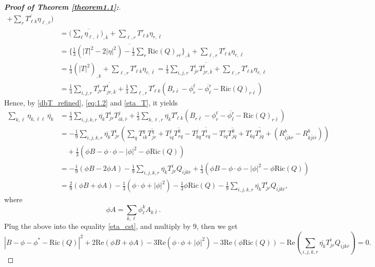 \documentclass{amsart}
\numberwithin{equation}{section}
\theoremstyle{definition}
\renewcommand{\1}{\mathds{1}}
\renewcommand{\>}{\rightarrow}
\begin{document}
\begin{proof}[{\bf Proof of Theorem \ref{theorem1.1}:}]
\[\begin{aligned}
{+  \sum_r \overline{T^r_{\ell k}}\eta_{\ell,\bar{r}}} \big)  \\
&= \overline{ \big(\sum_\ell \eta_{\ell,\bar{\ell}}\big)_{\!,\bar{k}}} +  \sum_{\ell,r} T^r_{\ell k}\eta_{r,\bar{\ell}} \\
&= \overline{\big\{ \frac{1}{3}(|T|^2-2|\eta|^2)-\frac{1}{3} \sum_r \mathrm{Ric}(Q)_{r \bar{r}}\big\}_{\!,\bar{k}}}
+  \sum_{\ell,r} T^r_{\ell k}\eta_{r,\bar{\ell}} \\
&=  \frac{1}{3}(|T|^2)_{\!,k}
+  \sum_{\ell,r} T^r_{\ell k}\eta_{r,\bar{\ell}}  =    \frac{1}{3} \sum_{i,j ,r} T^i_{j r} \overline{  T^i_{j r,\bar{k} }  } +   \sum_{\ell,r} T^r_{\ell k}\eta_{r,\bar{\ell}}  \\
&= \frac{1}{3} \sum_{i,j,r}T^i_{jr} \overline{T^i_{jr,\bar{k}}} + \frac{1}{3} \sum_{\ell ,r}T^r_{\ell k} \left( B_{r \bar{\ell}} - \phi_r^{\ell} - \overline{\phi_{\ell}^r}  - \mathrm{Ric}(Q)_{r \bar{\ell}} \right)
\end{aligned}\]
Hence, by \eqref{dbT_refined}, \eqref{eq:1.2} and \eqref{eta_T}, it yields
\[ \begin{aligned}
\sum_{k,\ell}\eta_{k,\bar{\ell}\ell} \,\overline{\eta_k} &=
\frac{1}{3} \sum_{i,j,k,r} \overline{\eta_k} T^i_{jr} T^j_{ik,\bar{r}} + \frac{1}{3} \sum_{k,\ell ,r} \overline{\eta_k} T^r_{\ell k} \left(  B_{r \bar{\ell}} - \phi_r^{\ell} - \overline{\phi_{\ell}^r} -  \mathrm{Ric}(Q)_{r \bar{\ell}} \right) \\
&= -\frac{1}{9} \sum_{i,j,k,r} \overline{\eta_k} T^i_{jr} \left(\sum_q T^q_{ik}\overline{T^q_{j r}} + T^j_{iq} \overline{T^k_{r q}}
- T^j_{kq}\overline{T^i_{r q}} - T^r_{iq} \overline{T^k_{jq}} + T^r_{kq}\overline{T^i_{jq}}
+ ( R^b_{i\bar{j}k\bar{r}} - R^b_{k \bar{j} i \bar{r}} )\right) \\
&\quad + \frac{1}{3}(\phi B - \phi \cdot \phi - |\phi|^2 - \phi \mathrm{Ric}(Q)) \\
&= -\frac{1}{9}(\phi B - 2\phi A)  - \frac{1}{9} \sum_{i,j,k,r} \overline{\eta_k} T^i_{jr} Q_{i\bar{j}k\bar{r}} + \frac{1}{3}( \phi B - \phi \cdot \phi - |\phi|^2  - \phi \mathrm{Ric}(Q))
 \\
&= \frac{2}{9}(\phi B + \phi A)- \frac{1}{3}(\phi \cdot \phi + |\phi|^2) - \frac{1}{3} \phi \mathrm{Ric}(Q)
- \frac{1}{9} \sum_{i,j,k,r} \overline{\eta_k} T^i_{jr} Q_{i\bar{j}k\bar{r}} ,
\end{aligned}\]
where
\[\phi A = \sum_{k,\ell}\phi^k_{\ell} A_{k \bar{\ell}}.\]
Plug the above into  the equality \eqref{eta_cst}, and multiply by 9, then we get
\[ |B- \phi - \phi^{\ast} - \mathrm{Ric}(Q) |^2 + 2 \mathrm{Re}(\phi B + \phi A) - 3\mathrm{Re}(\phi \cdot \phi + |\phi|^2) -3\mathrm{Re}(\phi \mathrm{Ric}(Q)) - \mathrm{Re}(\sum_{i,j,k,r} \overline{\eta_k} T^i_{jr} Q_{i\bar{j}k\bar{r}}) = 0. \]

\end{proof}
\end{document}

